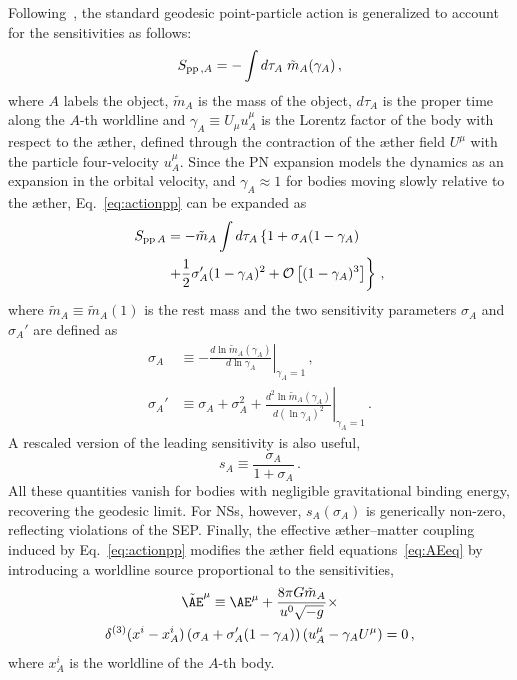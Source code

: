 \documentclass[
    floats,
    floatfix,
    amssymb,
    prd,
    twocolumn,
    superscriptaddress,
    nofootinbib,
    unicode,
    colorlinks=true,
    linktocpage=true
]{revtex4-2}
\begin{document}
Following~\cite{Foster:2007gr}, the standard geodesic point-particle action is 
generalized to account for the sensitivities as follows:
%
\begin{equation}
\label{eq:actionpp}
S_{{\rm pp}\,,A} = - \int d\tau_A \; \tilde{m}_{A}(\gamma_{A})\,,
\end{equation}
%
where $A$ labels the object, $\tilde{m}_A$ is the mass of the object, $d\tau_A$ is the proper time along the 
$A$-th worldline and $\gamma_{A} \equiv U_{\mu} u_{A}^{\mu}$
is the Lorentz 
factor of the body with respect to the \ae ther, defined through the contraction 
of the \ae ther field $U^{\mu}$ with the particle four-velocity $u_{A}^{\mu}$.
Since the PN expansion models the dynamics as an expansion in the orbital velocity, 
and $\gamma_A \approx 1$ for bodies moving slowly relative to the \ae ther, 
Eq.~\eqref{eq:actionpp} can be expanded as
%
\begin{align}
\label{taylor-pp}
S_{{\rm pp}\,A} &= -\tilde{m}_{A} \int d\tau_A 
\left\{ 1 + \sigma_{A}(1 - \gamma_{A}) \right.
\nonumber \\
&\left. + \frac{1}{2}\sigma_{A}'(1 - \gamma_{A})^{2} 
+ \mathcal{O}\left[(1 - \gamma_{A})^{3}\right] \right\}\,,
\end{align}
%
where $\tilde{m}_{A} \equiv \tilde{m}_{A}(1)$ is the rest mass and the two 
sensitivity parameters $\sigma_{A}$ and $\sigma_{A}'$ are defined as
%
\begin{align}
\label{sigma-def}
\sigma_{A} &\equiv -\left.\frac{d\ln\tilde{m}_{A}(\gamma_A)}{d\ln\gamma_{A}}
\right|_{\gamma_{A}=1}\,,\\[4pt]
\sigma_{A}' &\equiv \sigma_{A} + \sigma_{A}^{2} + 
\left.\frac{d^{2}\ln\tilde{m}_{A}(\gamma_A)}{d(\ln\gamma_{A})^{2}}
\right|_{\gamma_{A}=1}\,.
\end{align}
%
A rescaled version of the leading sensitivity is also useful, 
%
\begin{equation}
\label{s-sigma-rel}
s_{A} \equiv \frac{\sigma_{A}}{1 + \sigma_{A}}\,.
\end{equation}
%
All these quantities vanish for bodies with negligible gravitational 
binding energy, recovering the geodesic limit. For NSs, however, 
$s_A (\sigma_A)$ is generically non-zero, reflecting  violations of the  SEP. Finally, the effective \ae ther--matter coupling induced by Eq.~\eqref{eq:actionpp} 
modifies the \ae ther field equations~\eqref{eq:AEeq} by introducing a 
worldline source proportional to the sensitivities,
%
\begin{multline}
\label{eq:AEsens}
\tilde{\AE}^{\mu} \equiv \AE^{\mu} + \frac{8\pi G\tilde{m}_A}{u^{0}\sqrt{-g}}
\times \\ 
\delta^{(3)}(x^{i} - x^{i}_{A})\left(\sigma_A + \sigma_A'(1-\gamma_A)\right)
\left(u_{A}^{\mu} - \gamma_A U^{\mu}\right) = 0\,,
\end{multline}
%
where $x_{A}^{i}$ is the worldline of the $A$-th body.
\end{document}
